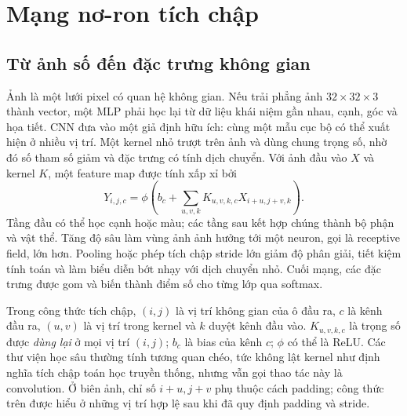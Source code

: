 \documentclass[12pt,a4paper]{report}
\begin{document}
\chapter{Mạng nơ-ron tích chập}\label{ch:cnn}
\section{Từ ảnh số đến đặc trưng không gian}
Ảnh là một lưới pixel có quan hệ không gian. Nếu trải phẳng ảnh $32\times32\times3$ thành vector, một MLP phải học lại từ dữ liệu khái niệm gần nhau, cạnh, góc và họa tiết. CNN đưa vào một giả định hữu ích: cùng một mẫu cục bộ có thể xuất hiện ở nhiều vị trí. Một kernel nhỏ trượt trên ảnh và dùng chung trọng số, nhờ đó số tham số giảm và đặc trưng có tính dịch chuyển. Với ảnh đầu vào $X$ và kernel $K$, một feature map được tính xấp xỉ bởi
\begin{equation}Y_{i,j,c}=\phi\left(b_c+\sum_{u,v,k}K_{u,v,k,c}X_{i+u,j+v,k}\right).\end{equation}
Tầng đầu có thể học cạnh hoặc màu; các tầng sau kết hợp chúng thành bộ phận và vật thể. Tăng độ sâu làm vùng ảnh ảnh hưởng tới một neuron, gọi là receptive field, lớn hơn. Pooling hoặc phép tích chập stride lớn giảm độ phân giải, tiết kiệm tính toán và làm biểu diễn bớt nhạy với dịch chuyển nhỏ. Cuối mạng, các đặc trưng được gom và biến thành điểm số cho từng lớp qua softmax.

Trong công thức tích chập, $(i,j)$ là vị trí không gian của ô đầu ra, $c$ là kênh đầu ra, $(u,v)$ là vị trí trong kernel và $k$ duyệt kênh đầu vào. $K_{u,v,k,c}$ là trọng số được \emph{dùng lại} ở mọi vị trí $(i,j)$; $b_c$ là bias của kênh $c$; $\phi$ có thể là ReLU. Các thư viện học sâu thường tính tương quan chéo, tức không lật kernel như định nghĩa tích chập toán học truyền thống, nhưng vẫn gọi thao tác này là convolution. Ở biên ảnh, chỉ số $i+u,j+v$ phụ thuộc cách padding; công thức trên được hiểu ở những vị trí hợp lệ sau khi đã quy định padding và stride.
\end{document}
